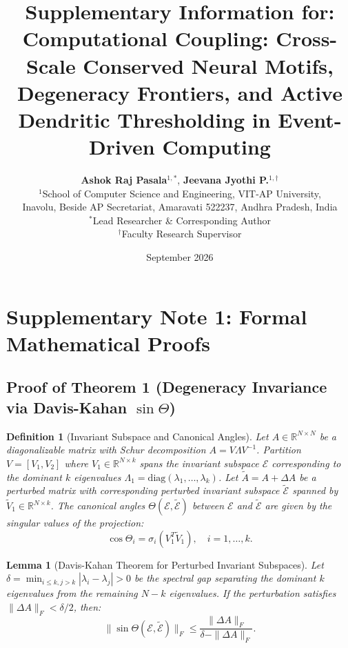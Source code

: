 \documentclass[10pt,letterpaper]{article}
\title{\textbf{Supplementary Information for:\\Computational Coupling: Cross-Scale Conserved Neural Motifs, Degeneracy Frontiers, and Active Dendritic Thresholding in Event-Driven Computing}}
\author{
  \textbf{Ashok Raj Pasala}$^{1,*}$, \quad \textbf{Jeevana Jyothi P.}$^{1,\dagger}$ \\[4pt]
  \small $^{1}$School of Computer Science and Engineering, VIT-AP University,\\
  \small Inavolu, Beside AP Secretariat, Amaravati 522237, Andhra Pradesh, India\\[2pt]
  \small $^{*}$Lead Researcher \& Corresponding Author\\
  \small $^{\dagger}$Faculty Research Supervisor
}
\date{September 2026}
\newtheorem{lemma}{Lemma}
\newtheorem{definition}{Definition}
\begin{document}
\maketitle

\tableofcontents
\newpage

\section{Supplementary Note 1: Formal Mathematical Proofs}

\subsection{Proof of Theorem 1 (Degeneracy Invariance via Davis-Kahan $\sin\Theta$)}

\begin{definition}[Invariant Subspace and Canonical Angles]
Let $A \in \mathbb{R}^{N \times N}$ be a diagonalizable matrix with Schur decomposition $A = V \Lambda V^{-1}$. Partition $V = [V_1, V_2]$ where $V_1 \in \mathbb{R}^{N \times k}$ spans the invariant subspace $\mathcal{E}$ corresponding to the dominant $k$ eigenvalues $\Lambda_1 = \mathrm{diag}(\lambda_1, \dots, \lambda_k)$. Let $\tilde{A} = A + \Delta A$ be a perturbed matrix with corresponding perturbed invariant subspace $\tilde{\mathcal{E}}$ spanned by $\tilde{V}_1 \in \mathbb{R}^{N \times k}$. The canonical angles $\Theta(\mathcal{E}, \tilde{\mathcal{E}})$ between $\mathcal{E}$ and $\tilde{\mathcal{E}}$ are given by the singular values of the projection:
\begin{equation}
\cos\Theta_i = \sigma_i(V_1^T \tilde{V}_1), \quad i = 1, \dots, k.
\end{equation}
\end{definition}

\begin{lemma}[Davis-Kahan Theorem for Perturbed Invariant Subspaces]
Let $\delta = \min_{i \le k, j > k} |\lambda_i - \lambda_j| > 0$ be the spectral gap separating the dominant $k$ eigenvalues from the remaining $N - k$ eigenvalues. If the perturbation satisfies $\|\Delta A\|_F < \delta / 2$, then:
\begin{equation}
\|\sin\Theta(\mathcal{E}, \tilde{\mathcal{E}})\|_F \le \frac{\|\Delta A\|_F}{\delta - \|\Delta A\|_F}.
\end{equation}
\end{lemma}
\end{document}
